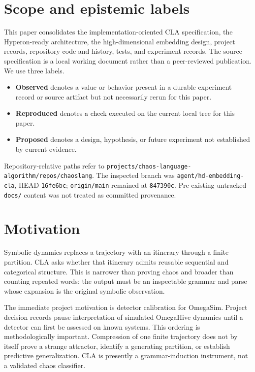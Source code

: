 \documentclass[11pt]{article}
\newcommand{\Observed}{\textbf{Observed}}
\newcommand{\Reproduced}{\textbf{Reproduced}}
\newcommand{\Proposed}{\textbf{Proposed}}
\begin{document}
\section{Scope and epistemic labels}
This paper consolidates the implementation-oriented CLA specification, the Hyperon-ready architecture, the high-dimensional embedding design, project records, repository code and history, tests, and experiment records. The source specification is a local working document rather than a peer-reviewed publication. We use three labels.
\begin{itemize}[leftmargin=*]
\item \Observed{} denotes a value or behavior present in a durable experiment record or source artifact but not necessarily rerun for this paper.
\item \Reproduced{} denotes a check executed on the current local tree for this paper.
\item \Proposed{} denotes a design, hypothesis, or future experiment not established by current evidence.
\end{itemize}
Repository-relative paths refer to \texttt{projects/chaos-language-algorithm/repos/chaoslang}. The inspected branch was \texttt{agent/hd-embedding-cla}, HEAD \texttt{16fe6bc}; \texttt{origin/main} remained at \texttt{847390c}. Pre-existing untracked \texttt{docs/} content was not treated as committed provenance.

\section{Motivation}
Symbolic dynamics replaces a trajectory with an itinerary through a finite partition. CLA asks whether that itinerary admits reusable sequential and categorical structure. This is narrower than proving chaos and broader than counting repeated words: the output must be an inspectable grammar and parse whose expansion is the original symbolic observation.

The immediate project motivation is detector calibration for OmegaSim. Project decision records pause interpretation of simulated OmegaHive dynamics until a detector can first be assessed on known systems. This ordering is methodologically important. Compression of one finite trajectory does not by itself prove a strange attractor, identify a generating partition, or establish predictive generalization. CLA is presently a grammar-induction instrument, not a validated chaos classifier.
\end{document}
